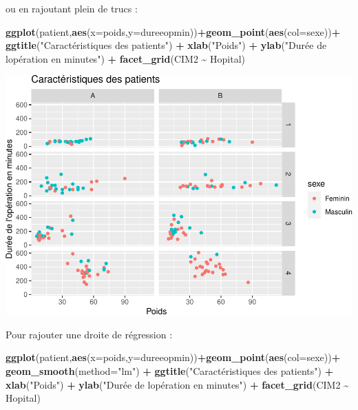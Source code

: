 \documentclass[
]{book}
\newenvironment{Shaded}{\begin{snugshade}}{\end{snugshade}}
\newcommand{\AttributeTok}[1]{\textcolor[rgb]{0.13,0.29,0.53}{#1}}
\newcommand{\FunctionTok}[1]{\textcolor[rgb]{0.13,0.29,0.53}{\textbf{#1}}}
\newcommand{\NormalTok}[1]{#1}
\newcommand{\SpecialCharTok}[1]{\textcolor[rgb]{0.81,0.36,0.00}{\textbf{#1}}}
\newcommand{\StringTok}[1]{\textcolor[rgb]{0.31,0.60,0.02}{#1}}
\begin{document}
ou en rajoutant plein de trucs :

\begin{Shaded}
\begin{Highlighting}[]
\FunctionTok{ggplot}\NormalTok{(patient,}\FunctionTok{aes}\NormalTok{(}\AttributeTok{x=}\NormalTok{poids,}\AttributeTok{y=}\NormalTok{dureeopmin))}\SpecialCharTok{+}\FunctionTok{geom\_point}\NormalTok{(}\FunctionTok{aes}\NormalTok{(}\AttributeTok{col=}\NormalTok{sexe))}\SpecialCharTok{+}
  \FunctionTok{ggtitle}\NormalTok{(}\StringTok{"Caractéristiques des patients"}\NormalTok{) }\SpecialCharTok{+} 
  \FunctionTok{xlab}\NormalTok{(}\StringTok{"Poids"}\NormalTok{) }\SpecialCharTok{+} 
  \FunctionTok{ylab}\NormalTok{(}\StringTok{"Durée de l\textquotesingle{}opération en minutes"}\NormalTok{) }\SpecialCharTok{+}
  \FunctionTok{facet\_grid}\NormalTok{(CIM2 }\SpecialCharTok{\textasciitilde{}}\NormalTok{ Hopital)}
\end{Highlighting}
\end{Shaded}

\includegraphics{_main_files/figure-latex/ggplot16-1.pdf}

Pour rajouter une droite de régression :

\begin{Shaded}
\begin{Highlighting}[]
\FunctionTok{ggplot}\NormalTok{(patient,}\FunctionTok{aes}\NormalTok{(}\AttributeTok{x=}\NormalTok{poids,}\AttributeTok{y=}\NormalTok{dureeopmin))}\SpecialCharTok{+}\FunctionTok{geom\_point}\NormalTok{(}\FunctionTok{aes}\NormalTok{(}\AttributeTok{col=}\NormalTok{sexe))}\SpecialCharTok{+}
  \FunctionTok{geom\_smooth}\NormalTok{(}\AttributeTok{method=}\StringTok{"lm"}\NormalTok{) }\SpecialCharTok{+}
  \FunctionTok{ggtitle}\NormalTok{(}\StringTok{"Caractéristiques des patients"}\NormalTok{) }\SpecialCharTok{+} 
  \FunctionTok{xlab}\NormalTok{(}\StringTok{"Poids"}\NormalTok{) }\SpecialCharTok{+} 
  \FunctionTok{ylab}\NormalTok{(}\StringTok{"Durée de l\textquotesingle{}opération en minutes"}\NormalTok{) }\SpecialCharTok{+}
  \FunctionTok{facet\_grid}\NormalTok{(CIM2 }\SpecialCharTok{\textasciitilde{}}\NormalTok{ Hopital)}
\end{Highlighting}
\end{Shaded}
\end{document}
